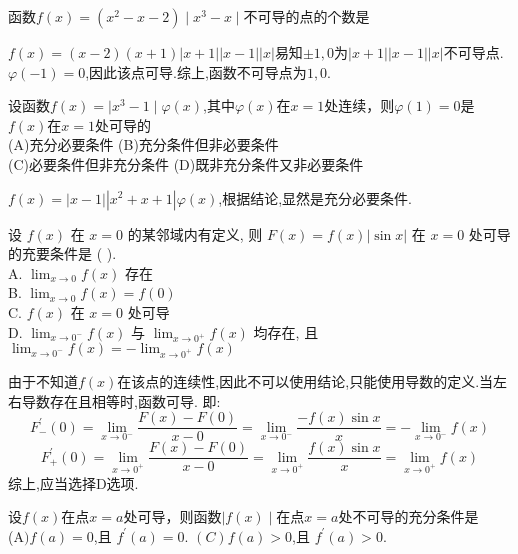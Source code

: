 \documentclass[8pt a4paper, oneside, UTF8]{ctexbook}  %
\begin{document}
\begin{sloppypar}
\begin{solution}
    \end{solution}
    \begin{problem}
        函数$f(x)=(x^2-x-2)\mid x^3-x\mid$不可导的点的个数是
    \end{problem}
    \begin{solution}
        $f(x)=(x-2)(x+1)|x+1||x-1||x|$易知$\pm 1,0$为$|x+1||x-1||x|$不可导点.$\varphi(-1) = 0$,因此该点可导.综上,函数不可导点为$1,0$.
    \end{solution}
    \begin{problem}
        设函数$f(x)=\mid x^3-1\mid\varphi(x)$,其中$\varphi(x)$在$x=1$处连续，则$\varphi(1)=0$是$f(x)$在$x=1$处可导的 \\
        (A)充分必要条件 \quad (B)充分条件但非必要条件\\
        (C)必要条件但非充分条件 \quad (D)既非充分条件又非必要条件 
    \end{problem}
    \begin{solution}
        $f(x)=|x-1||x^2+x+1|\varphi(x)$,根据结论,显然是充分必要条件.
    \end{solution}
    \begin{problem}
        设 $f(x)$ 在 $x=0$ 的某邻域内有定义, 则 $F(x)=f(x)|\sin x|$ 在 $x=0$ 处可导的充要条件是 ( ).\\
        A. $\lim _{x \rightarrow 0} f(x)$ 存在\\
        B. $\lim _{x \rightarrow 0} f(x)=f(0)$\\
        C. $f(x)$ 在 $x=0$ 处可导\\
        D. $\lim _{x \rightarrow 0^{-}} f(x)$ 与 $\lim _{x \rightarrow 0^{+}} f(x)$ 均存在, 且 $\lim _{x \rightarrow 0^{-}} f(x)=-\lim _{x \rightarrow 0^{+}} f(x)$            
    \end{problem}
    \begin{solution}
         由于不知道$f(x)$在该点的连续性,因此不可以使用结论,只能使用导数的定义.当左右导数存在且相等时,函数可导. 即:
         $$
            F_{-}^{\prime}(0)=\lim_{x\to0^{-}}\frac{F(x)-F(0)}{x-0}=\lim_{x\to0^{-}}\frac{-f(x)\sin x}{x}=-\lim_{x\to0^{-}}f(x)
         $$
         $$
            F_{+}^{\prime}(0)=\lim_{x\to0^{+}}\frac{F(x)-F(0)}{x-0}=\lim_{x\to0^{+}}\frac{f(x)\sin x}{x}=\lim_{x\to0^{+}}f(x)
         $$
         综上,应当选择D选项.
    \end{solution}
    \begin{problem}
        设$f(x)$在点$x=a$处可导，则函数$\mid f(x)\mid$在点$x=a$处不可导的充分条件是\\
        (A$)f(a)=0$,且 $f^\prime(a)=0.$ \quad $(C)f(a)>0$,且 $f^\prime(a)>0.$ \\

\end{problem}
\end{sloppypar}
\end{document}
